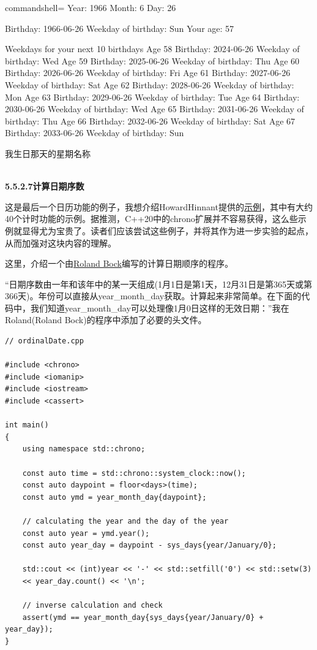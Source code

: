 \begin{tcblisting}{commandshell={}}
Year: 1966
Month: 6
Day: 26

Birthday: 1966-06-26
Weekday of birthday: Sun
Your age: 57

Weekdays for your next 10 birthdays
  Age 58
    Birthday: 2024-06-26
    Weekday of birthday: Wed
  Age 59
    Birthday: 2025-06-26
    Weekday of birthday: Thu
  Age 60
    Birthday: 2026-06-26
    Weekday of birthday: Fri
  Age 61
    Birthday: 2027-06-26
    Weekday of birthday: Sat
  Age 62
    Birthday: 2028-06-26
    Weekday of birthday: Mon
  Age 63
    Birthday: 2029-06-26
    Weekday of birthday: Tue
  Age 64
    Birthday: 2030-06-26
    Weekday of birthday: Wed
  Age 65
    Birthday: 2031-06-26
    Weekday of birthday: Thu
  Age 66
    Birthday: 2032-06-26
    Weekday of birthday: Sat
  Age 67
    Birthday: 2033-06-26
    Weekday of birthday: Sun
\end{tcblisting}

\begin{center}
我生日那天的星期名称
\end{center}

\hspace*{\fill} \\ %
\noindent
\textbf{5.5.2.7\hspace{0.2cm}计算日期序数}

这是最后一个日历功能的例子，我想介绍HowardHinnant提供的\href{https://github.com/HowardHinnant/date/wiki/Examples-and-Recipes}{示例}，其中有大约40个计时功能的示例。据推测，C++20中的chrono扩展并不容易获得，这么些示例就显得尤为宝贵了。读者们应该尝试这些例子，并将其作为进一步实验的起点，从而加强对这块内容的理解。

这里，介绍一个由\href{https://github.com/rbock}{Roland Bock}编写的计算日期顺序的程序。

“日期序数由一年和该年中的某一天组成(1月1日是第1天，12月31日是第365天或第366天)。年份可以直接从year\_month\_day获取。计算起来非常简单。在下面的代码中，我们知道year\_month\_day可以处理像1月0日这样的无效日期：”我在Roland(Roland Bock)的程序中添加了必要的头文件。

\begin{lstlisting}[style=styleCXX]
// ordinalDate.cpp

#include <chrono>
#include <iomanip>
#include <iostream>
#include <cassert>

int main()
{
	using namespace std::chrono;
	
	const auto time = std::chrono::system_clock::now();
	const auto daypoint = floor<days>(time);
	const auto ymd = year_month_day{daypoint};
	
	// calculating the year and the day of the year
	const auto year = ymd.year();
	const auto year_day = daypoint - sys_days{year/January/0};
	
	std::cout << (int)year << '-' << std::setfill('0') << std::setw(3)
	<< year_day.count() << '\n';
	
	// inverse calculation and check
	assert(ymd == year_month_day{sys_days{year/January/0} + year_day});
}
\end{lstlisting}

